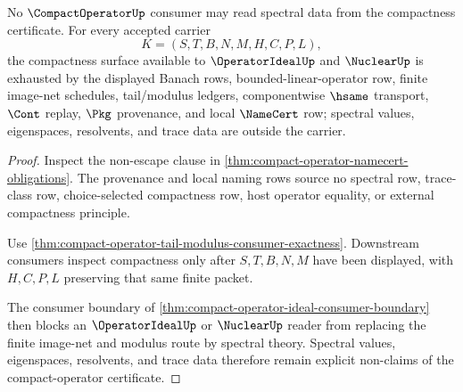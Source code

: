 \begin{theorem}
\label{thm:compact-operator-spectral-refusal-boundary}
No $\CompactOperatorUp$ consumer may read spectral data from the compactness certificate. For every accepted carrier
$$
K=(S,T,B,N,M,H,C,P,L),
$$
the compactness surface available to $\OperatorIdealUp$ and $\NuclearUp$ is exhausted by the displayed Banach rows, bounded-linear-operator row, finite image-net schedules, tail/modulus ledgers, componentwise $\hsame$ transport, $\Cont$ replay, $\Pkg$ provenance, and local $\NameCert$ row; spectral values, eigenspaces, resolvents, and trace data are outside the carrier.
\end{theorem}
\begin{proof}
Inspect the non-escape clause in \autoref{thm:compact-operator-namecert-obligations}. The provenance and local naming rows source no spectral row, trace-class row, choice-selected compactness row, host operator equality, or external compactness principle.

Use \autoref{thm:compact-operator-tail-modulus-consumer-exactness}. Downstream consumers inspect compactness only after $S,T,B,N,M$ have been displayed, with $H,C,P,L$ preserving that same finite packet.

The consumer boundary of \autoref{thm:compact-operator-ideal-consumer-boundary} then blocks an $\OperatorIdealUp$ or $\NuclearUp$ reader from replacing the finite image-net and modulus route by spectral theory. Spectral values, eigenspaces, resolvents, and trace data therefore remain explicit non-claims of the compact-operator certificate.
\end{proof}

